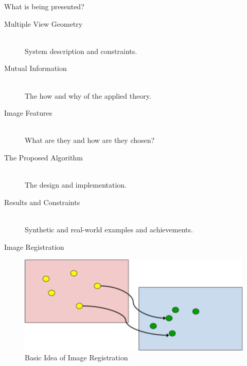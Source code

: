 \documentclass{beamer}
\begin{document}
\begin{frame}[t]{\sc What is being presented?}

\vfill

\begin{description}
\item[Multiple View Geometry] \hspace*{\fill} \\
System description and constraints.

\item[Mutual Information] \hspace*{\fill} \\
The how and why of the applied theory.

\item[Image Features] \hspace*{\fill} \\
What are they and how are they chosen?

\item[The Proposed Algorithm] \hspace*{\fill} \\
The design and implementation.

\item[Results and Constraints] \hspace*{\fill} \\
Synthetic and real-world examples and achievements.
\end{description}

\end{frame}




\begin{frame}[c]{\sc Image Registration}

\begin{figure}
\centering
\includegraphics[width=.95\columnwidth]{imageRegistration}
\caption{Basic Idea of Image Registration}
\label{imageRegistration}
\end{figure}

\end{frame}
\end{document}
